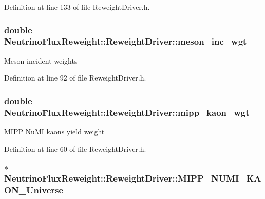 Definition at line 133 of file Reweight\-Driver.\-h.

\hypertarget{class_neutrino_flux_reweight_1_1_reweight_driver_a3b30ffd833e048ca64026eac4e26e054}{
\subsubsection[{meson\-\_\-inc\-\_\-wgt}]{\setlength{\rightskip}{0pt plus 5cm}double Neutrino\-Flux\-Reweight\-::\-Reweight\-Driver\-::meson\-\_\-inc\-\_\-wgt}}\label{class_neutrino_flux_reweight_1_1_reweight_driver_a3b30ffd833e048ca64026eac4e26e054}
Meson incident weights 

Definition at line 92 of file Reweight\-Driver.\-h.

\hypertarget{class_neutrino_flux_reweight_1_1_reweight_driver_a908938bcd5304de35956da51a806ef62}{
\subsubsection[{mipp\-\_\-kaon\-\_\-wgt}]{\setlength{\rightskip}{0pt plus 5cm}double Neutrino\-Flux\-Reweight\-::\-Reweight\-Driver\-::mipp\-\_\-kaon\-\_\-wgt}}\label{class_neutrino_flux_reweight_1_1_reweight_driver_a908938bcd5304de35956da51a806ef62}
M\-I\-P\-P Nu\-M\-I kaons yield weight 

Definition at line 60 of file Reweight\-Driver.\-h.

\hypertarget{class_neutrino_flux_reweight_1_1_reweight_driver_a58a8d80767fec9b87d60c1b548571d8b}{
\subsubsection[{M\-I\-P\-P\-\_\-\-N\-U\-M\-I\-\_\-\-K\-A\-O\-N\-\_\-\-Universe}]{$\ast$ Neutrino\-Flux\-Reweight\-::\-Reweight\-Driver\-::\-M\-I\-P\-P\-\_\-\-N\-U\-M\-I\-\_\-\-K\-A\-O\-N\-\_\-\-Universe}}\label{class_neutrino_flux_reweight_1_1_reweight_driver_a58a8d80767fec9b87d60c1b548571d8b}


